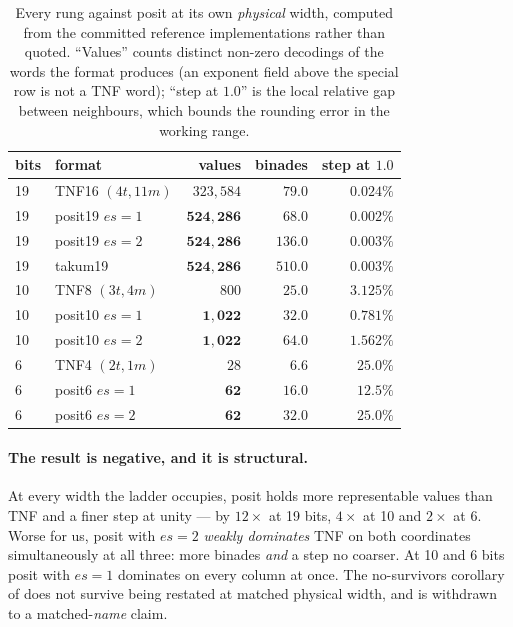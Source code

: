 \begin{table}[t]\centering
\caption{Every rung against posit at its own \emph{physical} width, computed
from the committed reference implementations rather than quoted. ``Values'' counts
distinct non-zero decodings of the words the format produces (an exponent field
above the special row is not a TNF word); ``step at $1.0$'' is the local relative
gap between neighbours, which bounds the rounding error in the working range.}
\label{tab:matchedwidth}
\begin{tabular}{llrrr}
\toprule
bits & format & values & binades & step at $1.0$ \\
\midrule
19 & TNF16 $(4t,11m)$ & $323{,}584$          & $79.0$  & $0.024\%$ \\
19 & posit19 $es{=}1$ & $\mathbf{524{,}286}$ & $68.0$  & $\mathbf{0.002\%}$ \\
19 & posit19 $es{=}2$ & $\mathbf{524{,}286}$ & $\mathbf{136.0}$ & $\mathbf{0.003\%}$ \\
19 & takum19          & $\mathbf{524{,}286}$ & $\mathbf{510.0}$ & $\mathbf{0.003\%}$ \\
\midrule
10 & TNF8 $(3t,4m)$   & $800$              & $25.0$ & $3.125\%$ \\
10 & posit10 $es{=}1$ & $\mathbf{1{,}022}$ & $\mathbf{32.0}$ & $\mathbf{0.781\%}$ \\
10 & posit10 $es{=}2$ & $\mathbf{1{,}022}$ & $\mathbf{64.0}$ & $\mathbf{1.562\%}$ \\
\midrule
6  & TNF4 $(2t,1m)$   & $28$          & $6.6$  & $25.0\%$ \\
6  & posit6 $es{=}1$  & $\mathbf{62}$ & $\mathbf{16.0}$ & $\mathbf{12.5\%}$ \\
6  & posit6 $es{=}2$  & $\mathbf{62}$ & $\mathbf{32.0}$ & $25.0\%$ \\
\bottomrule
\end{tabular}
\end{table}

\paragraph{The result is negative, and it is structural.} At every width the
ladder occupies, posit holds more representable values than TNF and a finer step
at unity --- by $12\times$ at 19 bits, $4\times$ at 10 and $2\times$ at 6. Worse
for us, posit with $es{=}2$ \emph{weakly dominates} TNF on both coordinates
simultaneously at all three: more binades \emph{and} a step no coarser. At 10 and
6 bits posit with $es{=}1$ dominates on every column at once. The
no-survivors corollary of  does not survive being
restated at matched physical width, and is withdrawn to a matched-\emph{name}
claim.

